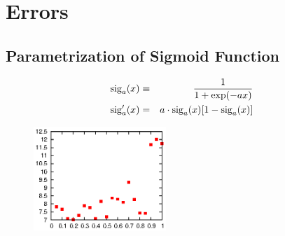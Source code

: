 \documentclass{beamer}
\begin{document}
\section{Errors}
\begin{frame}
    \tableofcontents
\end{frame}
\subsection{Parametrization of Sigmoid Function}
\begin{frame}
  \begin{eqnarray*}
    {\rm sig}_a(x)&\equiv&\frac{1}{1+\exp(-ax)}\\
    {\rm sig}'_a(x)&=&a\cdot{\rm sig}_a(x)[1-{\rm sig}_a(x)]
  \end{eqnarray*}
  \begin{figure}
    \centering
    \includegraphics[width=5cm]{fig/err/ea.eps}
  \end{figure}
\end{frame}
\end{document}
